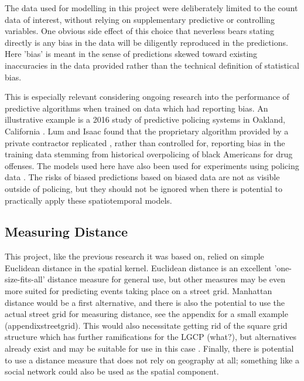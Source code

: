  The data used for modelling in this project were deliberately limited to the count data of interest, without relying on supplementary predictive or controlling variables.  One obvious side effect of this choice that neverless bears stating directly is any bias in the data will be diligently reproduced in the predictions. Here 'bias' is meant in the sense of predictions skewed toward existing inaccuracies in the data provided rather than the technical definition of statistical bias.\par

This is especially relevant considering ongoing research into the performance of predictive algorithms when trained on data which had reporting bias. An illustrative example is a 2016 study of predictive policing systems in Oakland, California \cite{lum2016predict}. Lum and Isaac found that the proprietary algorithm provided by a private contractor replicated , rather than controlled for, reporting bias in the training data stemming from historical overpolicing of black Americans for drug offenses. The models used here have also been used for experiments using policing data \cite{flaxman_2014} \cite{flaxman_2018}. The risks of biased predictions based on biased data are not as visible outside of policing, but they should not be ignored when there is potential to practically apply these spatiotemporal models.

\subsection{Measuring Distance}

This project, like the previous research it was based on, relied on simple Euclidean distance in the spatial kernel. Euclidean distance is an excellent 'one-size-fits-all' distance measure for general use, but other measures may be even more suited for predicting events taking place on a street grid. Manhattan distance would be a first alternative, and there is also the potential to use the actual street grid for measuring distance, see the appendix for a small example \todo(appendixstreetgrid). This would also necessitate getting rid of the square grid structure which has further ramifications for the LGCP \todo(what?), but alternatives already exist and may be suitable for use in this case \cite{simpson2016going}. Finally, there is potential to use a distance measure that does not rely on geography at all; something like a social network could also be used as the spatial component.


